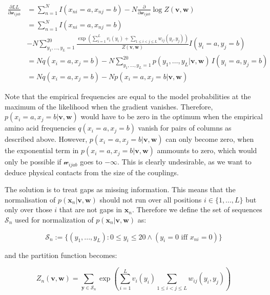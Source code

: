 \documentclass[12pt,a4paper,twoside]{book}
\newcommand{\eq}{\!=\!}
\newcommand{\seq}{\mathbf{x}}
\newcommand{\Sn}{\mathcal{S}_n}
\renewcommand{\v}{\mathbf{v}}
\newcommand{\w}{\mathbf{w}}
\newcommand{\wijab}{\mathcal{w}_{ijab}}
\theoremstyle{definition}
\theoremstyle{definition}
\theoremstyle{remark}
\begin{document}
\begin{align}
\frac{\partial LL}{\partial \wijab} &= \sum_{n=1}^N I(x_{ni}=a, x_{nj}=b)  - N \frac{\partial}{\partial \wijab} \log Z(\v,\w) \\
                                        &= \sum_{n=1}^N I(x_{ni} \eq a, x_{nj} \eq b) \\
                                        & - N \sum_{y_1,\ldots,y_L=1}^{20} \!\! \frac{ \exp \left( \sum_{i=1}^L v_i(y_i) + \sum_{1 \le i < j \le L} w_{ij}(y_i,y_j) \right)}{Z(\v,\w)}  I(y_i \eq a, y_j \eq b) \\
                                        &=  N q(x_{i} \eq a, x_{j} \eq b) - N \sum_{y_1,\ldots,y_L=1}^{20} p(y_1, \ldots, y_L | \v,\w) \, I(y_i \eq a, y_j \eq b) \\
                                        &=  N q(x_{i} \eq a, x_{j} \eq b) - N p(x_i \eq a, x_j \eq b | \v,\w) 
\label{eq:gradient-LLreg-gaps-single}
\end{align}

Note that the empirical frequencies are equal to the model probabilities
at the maximum of the likelihood when the gradient vanishes. Therefore,
\(p(x_i \eq a, x_j \eq b | \v, \w)\) would have to be zero in the
optimum when the empirical amino acid frequencies
\(q(x_i \eq a, x_j \eq b)\) vanish for pairs of columns as described
above. However, \(p(x_i \eq a, x_j \eq b | \v, \w)\) can only become
zero, when the exponential term in \(p(x_i \eq a, x_j \eq b | \v, \w)\)
ammounts to zero, which would only be possible if \(\wijab\) goes to
\(−\infty\). This is clearly undesirable, as we want to deduce physical
contacts from the size of the couplings.

The solution is to treat gaps as missing information. This means that
the normalisation of \(p(\seq_n | \v, \w)\) should not run over all
positions \(i \in \{1,... , L\}\) but only over those \(i\) that are not
gaps in \(\seq_n\). Therefore we define the set of sequences \(\Sn\)
used for normalization of \(p(\seq_n | \v, \w)\) as:

\begin{equation}
\Sn := \{(y_1,... , y_L): 0 \leq y_i \leq 20 \land (y_i \eq 0 \textrm{ iff } x_{ni} \eq 0) \}
\end{equation}

and the partition function becomes:

\begin{equation}
  Z_n(\v, \w) = \sum_{\mathbf{y} \in \Sn} \exp \left( \sum_{i=1}^L v_i(y_i) \sum_{1 \leq i < j \leq L} w_{ij}(y_i, y_j)  \right)
\end{equation}
\end{document}
